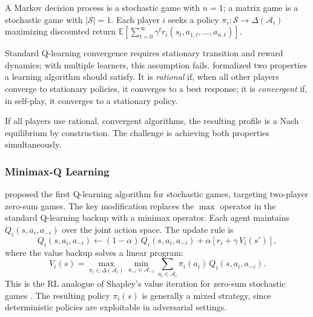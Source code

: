 A Markov decision process is a stochastic game with $n = 1$; a matrix game is a stochastic game with $|\mathcal{S}| = 1$. Each player $i$ seeks a policy $\pi_i: \mathcal{S} \to \Delta(\mathcal{A}_i)$ maximizing discounted return $\mathbb{E}[\sum_{t=0}^\infty \gamma^t r_i(s_t, a_{1,t}, \ldots, a_{n,t})]$.

Standard Q-learning convergence \citep{WatkinsDayan1992} requires stationary transition and reward dynamics; with multiple learners, this assumption fails. \citet{BowlingVeloso2002} formalized two properties a learning algorithm should satisfy. It is \emph{rational} if, when all other players converge to stationary policies, it converges to a best response; it is \emph{convergent} if, in self-play, it converges to a stationary policy.

If all players use rational, convergent algorithms, the resulting profile is a Nash equilibrium by construction. The challenge is achieving both properties simultaneously.

\subsubsection{Minimax-Q Learning}

\citet{littman1994markov} proposed the first Q-learning algorithm for stochastic games, targeting two-player zero-sum games. The key modification replaces the $\max$ operator in the standard Q-learning backup with a minimax operator. Each agent maintains $Q_i(s, a_i, a_{-i})$ over the joint action space. The update rule is
\begin{equation}
Q_i(s, a_i, a_{-i}) \leftarrow (1-\alpha)\, Q_i(s, a_i, a_{-i}) + \alpha\left[r_i + \gamma\, V_i(s')\right],
\end{equation}
where the value backup solves a linear program:
\begin{equation}
V_i(s) = \max_{\pi_i \in \Delta(\mathcal{A}_i)} \min_{a_{-i} \in \mathcal{A}_{-i}} \sum_{a_i \in \mathcal{A}_i} \pi_i(a_i)\, Q_i(s, a_i, a_{-i}).
\label{eq:minimaxv}
\end{equation}
This is the RL analogue of Shapley's value iteration for zero-sum stochastic games \citep{Shapley1964}. The resulting policy $\pi_i(s)$ is generally a mixed strategy, since deterministic policies are exploitable in adversarial settings.

